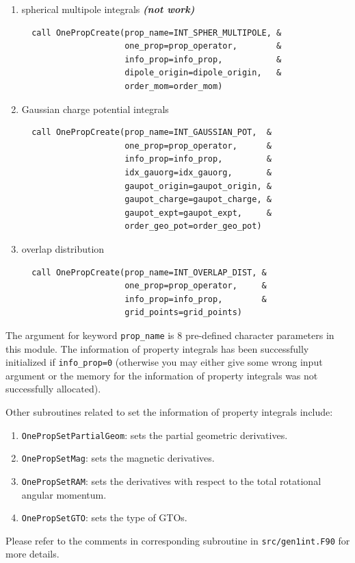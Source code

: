 \documentclass[a4paper,11pt,twoside,openright]{book}
\newcommand{\fixme}[1]{\textbf{\textit{\color{red} #1}}}
\begin{document}
\begin{enumerate}
\begin{verbatim}
\end{verbatim}
  \item spherical multipole integrals \fixme{(not work)}
\begin{verbatim}
  call OnePropCreate(prop_name=INT_SPHER_MULTIPOLE, &
                     one_prop=prop_operator,        &
                     info_prop=info_prop,           &
                     dipole_origin=dipole_origin,   &
                     order_mom=order_mom)
\end{verbatim}
  \item Gaussian charge potential integrals
\begin{verbatim}
  call OnePropCreate(prop_name=INT_GAUSSIAN_POT,  &
                     one_prop=prop_operator,      &
                     info_prop=info_prop,         &
                     idx_gauorg=idx_gauorg,       &
                     gaupot_origin=gaupot_origin, &
                     gaupot_charge=gaupot_charge, &
                     gaupot_expt=gaupot_expt,     &
                     order_geo_pot=order_geo_pot)
\end{verbatim}
  \item overlap distribution
\begin{verbatim}
  call OnePropCreate(prop_name=INT_OVERLAP_DIST, &
                     one_prop=prop_operator,     &
                     info_prop=info_prop,        &
                     grid_points=grid_points)
\end{verbatim}
\end{enumerate}

The argument for keyword \verb|prop_name| is 8 pre-defined character parameters in this module.
The information of property integrals has been successfully initialized if \verb|info_prop=0| (otherwise
you may either give some wrong input argument or the memory for the information of property integrals
was not successfully allocated).

Other subroutines related to set the information of property integrals include:
\begin{enumerate}
  \item \verb|OnePropSetPartialGeom|:
    sets the partial geometric derivatives.
  \item \verb|OnePropSetMag|:
    sets the magnetic derivatives.
  \item \verb|OnePropSetRAM|:
    sets the derivatives with respect to the total rotational angular momentum.
  \item \verb|OnePropSetGTO|:
    sets the type of GTOs.
\end{enumerate}
Please refer to the comments in corresponding subroutine in \verb|src/gen1int.F90| for more details.
\end{document}
